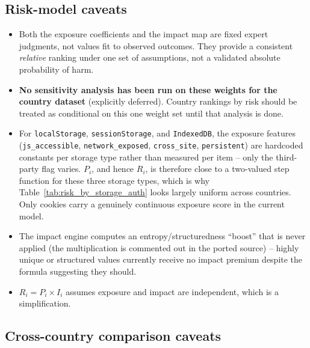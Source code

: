 \documentclass[11pt,a4paper]{article}
\newcommand{\code}[1]{\texttt{#1}}
\begin{document}
\subsection{Risk-model caveats}

\begin{itemize}[leftmargin=1.3cm]
  \item Both the exposure coefficients and the impact map are fixed expert
    judgments, not values fit to observed outcomes. They provide a
    consistent \emph{relative} ranking under one set of assumptions, not a
    validated absolute probability of harm.
  \item \textbf{No sensitivity analysis has been run on these weights for
    the country dataset} (explicitly deferred). Country rankings by risk
    should be treated as conditional on this one weight set until that
    analysis is done.
  \item For \code{localStorage}, \code{sessionStorage}, and
    \code{IndexedDB}, the exposure features (\code{js\_accessible},
    \code{network\_exposed}, \code{cross\_site}, \code{persistent}) are
    hardcoded constants per storage type rather than measured per item --
    only the third-party flag varies. $P_i$, and hence $R_i$, is therefore
    close to a two-valued step function for these three storage types,
    which is why Table~\ref{tab:risk_by_storage_auth} looks largely uniform
    across countries. Only cookies carry a genuinely continuous exposure
    score in the current model.
  \item The impact engine computes an entropy/structuredness ``boost'' that
    is never applied (the multiplication is commented out in the ported
    source) -- highly unique or structured values currently receive no
    impact premium despite the formula suggesting they should.
  \item $R_i = P_i \times I_i$ assumes exposure and impact are independent,
    which is a simplification.
\end{itemize}

\subsection{Cross-country comparison caveats}
\end{document}
